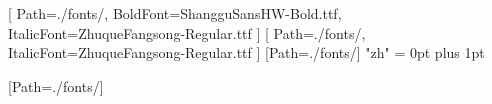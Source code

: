 
\providecommand{\ScriptsDebugFontRoot}{./fonts/}

\usepackage{xeCJK}
\newCJKfontfamily{}[
  Path=\ScriptsDebugFontRoot,
  BoldFont={ShangguSansHW-Bold.ttf},
  ItalicFont={ZhuqueFangsong-Regular.ttf}
]
\newCJKfontfamily{}[
  Path=\ScriptsDebugFontRoot,
  ItalicFont={ZhuqueFangsong-Regular.ttf}
]
\newCJKfontfamily{}[Path=\ScriptsDebugFontRoot]
\XeTeXlinebreaklocale "zh"
\XeTeXlinebreakskip = 0pt plus 1pt

\newfontfamily{}[Path=\ScriptsDebugFontRoot]
\newcommand{\TIMES}[1]{{\timesfont #1}}

\newfontfamily{}
\newcommand{\IPA}[1]{{\ipafont #1}}

\newcommand{\KO}[1]{\KR{#1}}
\newcommand{\NOM}[1]{\HN{#1}}

\usepackage{hiero}
